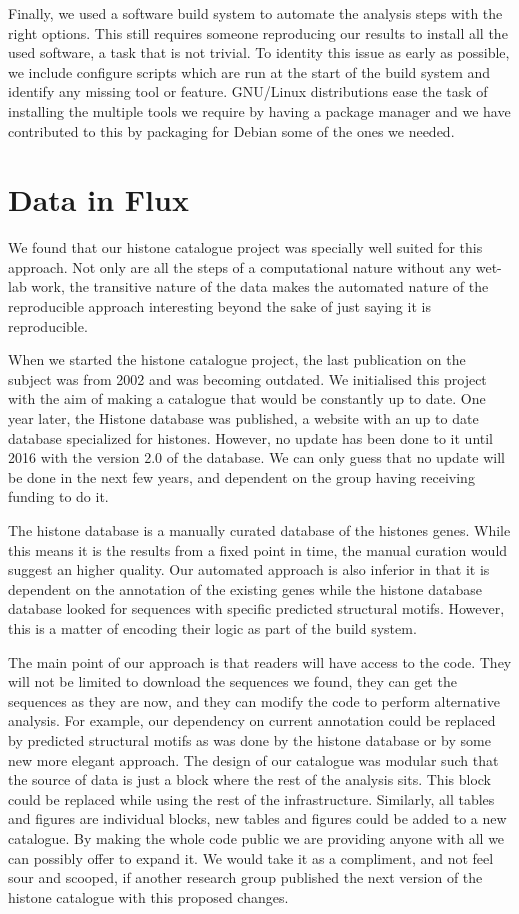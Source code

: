 Finally, we used a software build system to automate the analysis
steps with the right options.  This still requires someone reproducing
our results to install all the used software, a task that is not
trivial.  To identity this issue as early as possible, we include
configure scripts which are run at the start of the build system and
identify any missing tool or feature.  GNU/Linux distributions ease
the task of installing the multiple tools we require by having a
package manager and we have contributed to this by packaging for
Debian some of the ones we needed.

\section{Data in Flux}

We found that our histone catalogue project was specially well suited
for this approach.  Not only are all the steps of a computational
nature without any wet-lab work, the transitive nature of the data
makes the automated nature of the reproducible approach interesting
beyond the sake of just saying it is reproducible.

When we started the histone catalogue project, the last publication on
the subject was from 2002 and was becoming outdated.  We initialised
this project with the aim of making a catalogue that would be
constantly up to date.  One year later, the Histone database was published, a
website with an up to date database specialized for histones.
However, no update has been done to it until 2016 with the version 2.0 of
the database.  We can only guess that no update will be
done in the next few years, and dependent on the group having receiving
funding to do it.

The histone database is a manually curated database of the histones
genes.  While this means it is the results from a fixed point in time,
the manual curation would suggest an higher quality.  Our automated
approach is also inferior in that it is dependent on the
annotation of the existing genes while the histone database database looked for
sequences with specific predicted structural motifs.  However, this is
a matter of encoding their logic as part of the build system.

The main point of our approach is that readers will have access to the
code.  They will not be limited to download the sequences we found,
they can get the sequences as they are now, and they can modify the
code to perform alternative analysis.  For example, our dependency on
current annotation could be replaced by predicted structural motifs as
was done by the histone database or by some new more elegant approach.
The design of our catalogue was
modular such that the source of data is just a block where the rest of the
analysis sits.  This block could be replaced while using the rest of
the infrastructure.  Similarly, all tables and figures are individual
blocks, new tables and figures could be added to a new catalogue.
By making the whole code public we are providing
anyone with all we can possibly offer to expand it.
We would take it as a compliment, and not feel sour and scooped, if another
research group published the next version of the histone catalogue
with this proposed changes.

